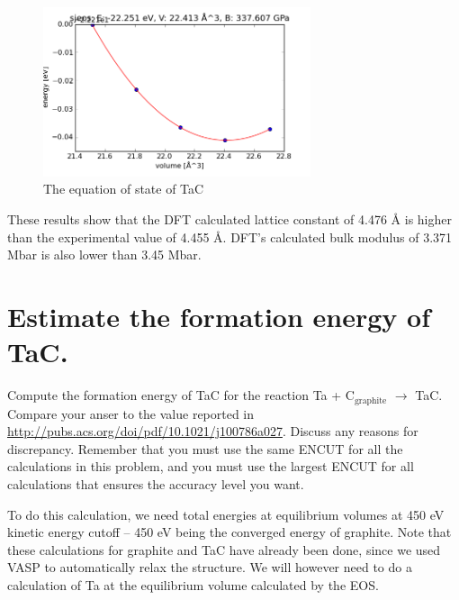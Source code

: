 \documentclass[11pt]{article}
\begin{document}
\begin{figure}[H]
\centering
\includegraphics[width=0.7\textwidth]{./6-1.png}
\caption{The equation of state of TaC}
\end{figure}

These results show that the DFT calculated lattice constant of 4.476 \AA{} is higher than the experimental value of 4.455 \AA{}. DFT's calculated bulk modulus of 3.371 Mbar is also lower than 3.45 Mbar.  
\section{Estimate the formation energy of TaC.}
\label{sec-7}

Compute the formation energy of TaC for the reaction Ta + C$_{\mathrm{graphite}}$ $\rightarrow$ TaC. Compare your anser to the value reported in \href{http://pubs.acs.org/doi/pdf/10.1021/j100786a027}{http://pubs.acs.org/doi/pdf/10.1021/j100786a027}. Discuss any reasons for discrepancy. Remember that you must use the same ENCUT for all the calculations in this problem, and you must use the largest ENCUT for all calculations that ensures the accuracy level you want.
\bigskip

To do this calculation, we need total energies at equilibrium volumes at 450 eV kinetic energy cutoff -- 450 eV being the converged energy of graphite. Note that these calculations for graphite and TaC have already been done, since we used VASP to automatically relax the structure. We will however need to do a calculation of Ta at the equilibrium volume calculated by the EOS.
\end{document}
